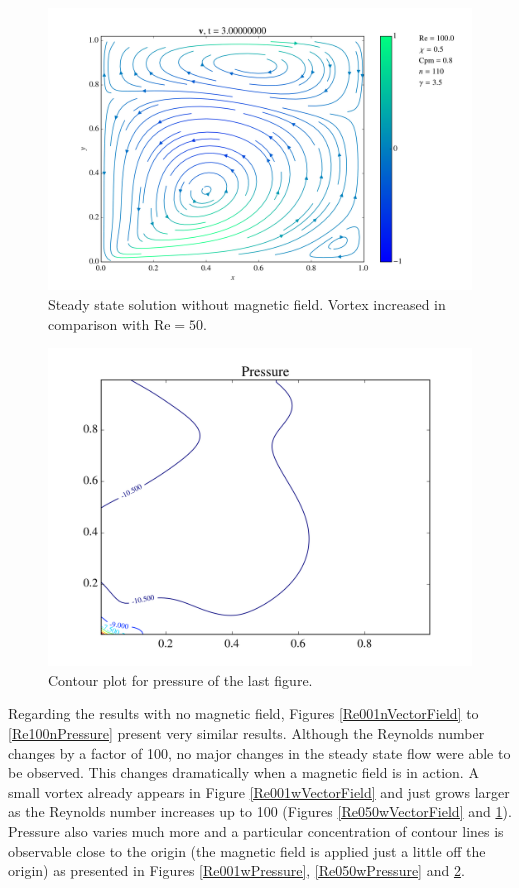 \documentclass[journal]{IEEEtran}
\begin{document}
\begin{figure}[!t]
\centering
\includegraphics[width=\linewidth]{figures/Re100/w/vectorField}
\caption{Steady state solution without magnetic field. Vortex increased in comparison with $\mathrm{Re} = 50$. \label{Re100wVectorField}}
\end{figure}

\begin{figure}[!t]
\centering
\includegraphics[width=\linewidth]{figures/Re100/w/pressure}
\caption{Contour plot for pressure of the last figure. \label{Re100wPressure}}
\end{figure}

Regarding the results with no magnetic field, Figures \ref{Re001nVectorField} to \ref{Re100nPressure} present very similar results. Although the Reynolds number changes by a factor of 100, no major changes in the steady state flow were able to be observed. This changes dramatically when a magnetic field is in action. A small vortex already appears in Figure \ref{Re001wVectorField} and just grows larger as the Reynolds number increases up to 100 (Figures \ref{Re050wVectorField} and \ref{Re100wVectorField}). Pressure also varies much more and a particular concentration of contour lines is observable close to the origin (the magnetic field is applied just a little off the origin) as presented in Figures \ref{Re001wPressure}, \ref{Re050wPressure} and \ref{Re100wPressure}.
\end{document}
